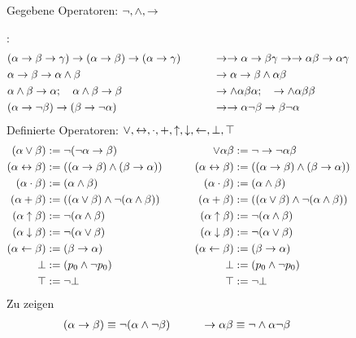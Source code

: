 Gegebene Operatoren: $\lnot, \land, \rightarrow$\par
{}:
\begin{align}
%
&(\alpha\limp\beta\limp\gamma)\limp(\alpha\limp\beta)%
\limp(\alpha\limp\gamma)
\formulaspace&&%
\limp\limp\alpha\limp\beta\gamma\limp\limp\alpha\beta%
\limp\alpha\gamma\\
%
&\alpha\limp\beta\limp\alpha\land\beta
\formulaspace&&%
\limp\alpha\limp\beta\land\alpha\beta\\
%
&\alpha\land\beta\limp\alpha ;\quad\alpha\land\beta\limp\beta
\formulaspace&&%
\limp\land\alpha\beta\alpha ;\quad\limp\land\alpha\beta\beta\\
%
&(\alpha\limp\lnot\beta)\limp(\beta\limp\lnot\alpha)
\formulaspace&&%
\limp\limp\alpha\lnot\beta\limp\beta\lnot\alpha
\formulatoleft
%
\end{align}
Definierte Operatoren: $\lor, \leftrightarrow, \cdot, +,
\uparrow, \downarrow, \leftarrow, \bot, \top$
\begin{align}
(\alpha\lor\beta)&\defeq\lnot(\lnot\alpha\limp\beta)
\formulaspace&%
\lor\alpha\beta&\defeq\lnot\limp\lnot\alpha\beta\\
%
(\alpha\lequiv\beta)&\defeq
((\alpha\limp\beta)\land(\beta\limp\alpha))
\formulaspace&%
(\alpha\lequiv\beta)&\defeq((\alpha\limp\beta)%
\land(\beta\limp\alpha))\\
%
(\alpha\lmult\beta)&\defeq(\alpha\land\beta)
\formulaspace&%
(\alpha\lmult\beta)&\defeq(\alpha\land\beta)\\
%
(\alpha\ladd\beta)&\defeq((\alpha\lor\beta)%
\land\lnot(\alpha\land\beta))
\formulaspace&%
(\alpha\ladd\beta)&\defeq((\alpha\lor\beta)%
\land\lnot(\alpha\land\beta))\\
%
(\alpha\lnand\beta)&\defeq\lnot(\alpha\land\beta)
\formulaspace&%
(\alpha\lnand\beta)&\defeq\lnot(\alpha\land\beta)\\
%
(\alpha\lnor\beta)&\defeq\lnot(\alpha\lor\beta)
\formulaspace&%
(\alpha\lnor\beta)&\defeq\lnot(\alpha\lor\beta)\\
%
(\alpha\lrep\beta)&\defeq(\beta\limp\alpha)
\formulaspace&%
(\alpha\lrep\beta)&\defeq(\beta\limp\alpha)\\
%
\lfalse&\defeq(p_0\land\lnot p_0)
\formulaspace&%
\lfalse&\defeq(p_0\land\lnot p_0)\\
%
\ltrue&\defeq\lnot\lfalse
\formulaspace&%
\ltrue&\defeq\lnot\lfalse
\formulatoleft
%
\end{align}
Zu zeigen
\begin{align}
(\alpha\rightarrow\beta)&\equiv\lnot(\alpha\land\lnot\beta)
&&&&
&\rightarrow\alpha\beta&\equiv\lnot\land\alpha\lnot\beta
&&&&&&&&&&
\end{align}

